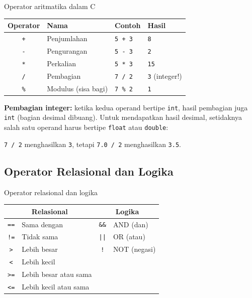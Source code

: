 \documentclass[../main.tex]{subfiles}
\begin{document}
\begin{modultable}[]{Operator aritmatika dalam C}
\begin{tabular}{|c|l|l|l|}
\hline
\textbf{Operator} & \textbf{Nama} & \textbf{Contoh} & \textbf{Hasil} \\
\hline
\texttt{+} & Penjumlahan & \texttt{5 + 3} & \texttt{8} \\
\hline
\texttt{-} & Pengurangan & \texttt{5 - 3} & \texttt{2} \\
\hline
\texttt{*} & Perkalian & \texttt{5 * 3} & \texttt{15} \\
\hline
\texttt{/} & Pembagian & \texttt{7 / 2} & \texttt{3} (integer!) \\
\hline
\texttt{\%} & Modulus (sisa bagi) & \texttt{7 \% 2} & \texttt{1} \\
\hline
\end{tabular}
\end{modultable}

\begin{catatan}
\textbf{Pembagian integer:} ketika kedua operand bertipe \texttt{int}, hasil pembagian juga \texttt{int} (bagian desimal dibuang). Untuk mendapatkan hasil desimal, setidaknya salah satu operand harus bertipe \texttt{float} atau \texttt{double}:

\texttt{7 / 2} menghasilkan \texttt{3}, tetapi \texttt{7.0 / 2} menghasilkan \texttt{3.5}.
\end{catatan}

\subsection{Operator Relasional dan Logika}

\begin{modultable}[]{Operator relasional dan logika}
\begin{tabular}{|c|l||c|l|}
\hline
\multicolumn{2}{|c||}{\textbf{Relasional}} & \multicolumn{2}{c|}{\textbf{Logika}} \\
\hline
\texttt{==} & Sama dengan & \texttt{\&\&} & AND (dan) \\
\hline
\texttt{!=} & Tidak sama & \texttt{||} & OR (atau) \\
\hline
\texttt{>} & Lebih besar & \texttt{!} & NOT (negasi) \\
\hline
\texttt{<} & Lebih kecil & & \\
\hline
\texttt{>=} & Lebih besar atau sama & & \\
\hline
\texttt{<=} & Lebih kecil atau sama & & \\
\hline
\end{tabular}
\end{modultable}
\end{document}
